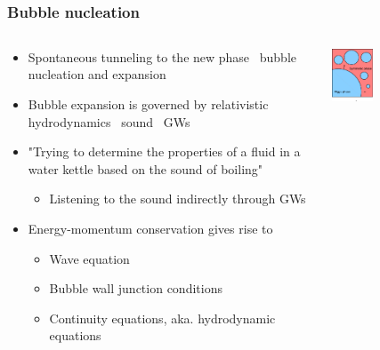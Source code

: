 \begin{frame}
\begin{columns}
\begin{column}{0.5\textwidth}
        \\
    \end{column}
    \end{columns}
\end{frame}

\begin{frame}
    \frametitle{Bubble nucleation}
    \begin{columns}
    \begin{column}{0.6\textwidth}
        \begin{itemize}
            \item Spontaneous tunneling to the new phase \textrightarrow \ bubble nucleation and expansion
            \item Bubble expansion is governed by relativistic hydrodynamics \textrightarrow \ sound \textrightarrow \ GWs
            \item "Trying to determine the properties of a fluid in a water kettle based on the sound of boiling"
            \begin{itemize}
                \item Listening to the sound indirectly through GWs
            \end{itemize}
            \item Energy-momentum conservation gives rise to
            \begin{itemize}
                \item Wave equation
                \item Bubble wall junction conditions
                \item Continuity equations, aka. hydrodynamic equations
            \end{itemize}
        \end{itemize}
    \end{column}
    \begin{column}{0.4\textwidth}
        \includegraphics[width=0.33\textwidth]{../fig/HiggsBubble1}%

\end{column}
\end{columns}
\end{frame}
